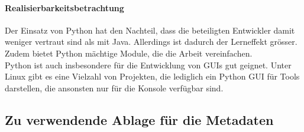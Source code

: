 \documentclass[10pt,paper=a4,final]{scrartcl}
\begin{document}
\paragraph{Realisierbarkeitsbetrachtung}
Der Einsatz von Python hat den Nachteil, dass die beteiligten Entwickler damit weniger vertraut sind als mit Java. Allerdings ist dadurch der Lerneffekt gr\"osser. Zudem bietet Python m\"achtige Module, die die Arbeit vereinfachen.\\
Python ist auch insbesondere f\"ur die Entwicklung von GUIs gut geignet. Unter Linux gibt es eine Vielzahl von Projekten, die lediglich ein Python GUI f\"ur Tools darstellen, die ansonsten nur f\"ur die Konsole verf\"ugbar sind.


\subsection{Zu verwendende Ablage f\"ur die Metadaten}
\end{document}
